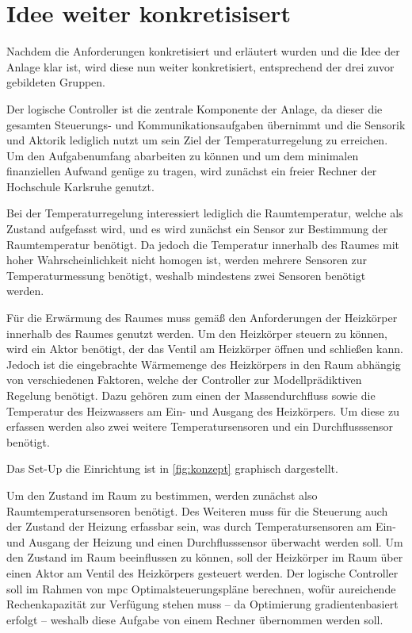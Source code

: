 \section{Idee weiter konkretisisert}

Nachdem die Anforderungen konkretisiert und erläutert wurden und die Idee der Anlage klar ist, wird diese nun weiter konkretisiert, entsprechend der drei zuvor gebildeten Gruppen.

Der logische Controller ist die zentrale Komponente der Anlage, da dieser die gesamten Steuerungs- und Kommunikationsaufgaben übernimmt und die Sensorik und Aktorik lediglich nutzt um sein Ziel der Temperaturregelung zu erreichen. Um den Aufgabenumfang abarbeiten zu können und um dem minimalen finanziellen Aufwand genüge zu tragen, wird zunächst ein freier Rechner der Hochschule Karlsruhe genutzt.

Bei der Temperaturregelung interessiert lediglich die Raumtemperatur, welche als Zustand aufgefasst wird, und es wird zunächst ein Sensor zur Bestimmung der Raumtemperatur benötigt. Da jedoch die Temperatur innerhalb des Raumes mit hoher Wahrscheinlichkeit nicht homogen ist, werden mehrere Sensoren zur Temperaturmessung benötigt, weshalb mindestens zwei Sensoren benötigt werden.

Für die Erwärmung des Raumes muss gemäß den Anforderungen der Heizkörper innerhalb des Raumes genutzt werden. Um den Heizkörper steuern zu können, wird ein Aktor benötigt, der das Ventil am Heizkörper öffnen und schließen kann. Jedoch ist die eingebrachte Wärmemenge des Heizkörpers in den Raum abhängig von verschiedenen Faktoren, welche der Controller zur Modellprädiktiven Regelung benötigt. Dazu gehören zum einen der Massendurchfluss sowie die Temperatur des Heizwassers am Ein- und Ausgang des Heizkörpers. Um diese zu erfassen werden also zwei weitere Temperatursensoren und ein Durchflusssensor benötigt.

Das Set-Up die Einrichtung ist in \ref{fig:konzept} graphisch dargestellt.



Um den Zustand im Raum zu bestimmen, werden zunächst also Raumtemperatursensoren benötigt. Des Weiteren muss für die Steuerung auch der Zustand der Heizung erfassbar sein, was durch Temperatursensoren am Ein- und Ausgang der Heizung und einen Durchflusssensor überwacht werden soll.
Um den Zustand im Raum beeinflussen zu können, soll der Heizkörper im Raum über einen Aktor am Ventil des Heizkörpers gesteuert werden.
Der logische Controller soll im Rahmen von \acrlong{mpc} Optimalsteuerungspläne berechnen, wofür aureichende Rechenkapazität zur Verfügung stehen muss -- da Optimierung gradientenbasiert erfolgt -- weshalb diese Aufgabe von einem Rechner übernommen werden soll.

